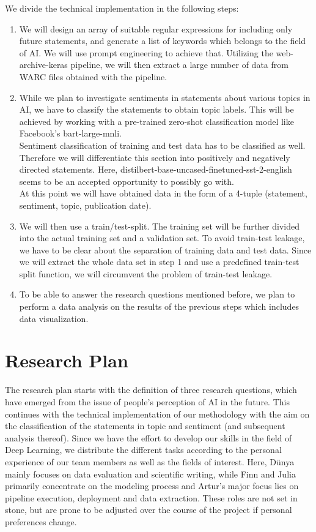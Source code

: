 \documentclass[11pt]{article}
\begin{document}
We divide the technical implementation in the following steps:

\begin{enumerate}
\item We will design an array of suitable regular expressions for including only future statements, and generate a list of keywords which belongs to the field of AI. We will use prompt engineering to achieve that. Utilizing the web-archive-keras pipeline, we will then extract a large number of data from WARC files obtained with the pipeline.

\item While we plan to investigate sentiments in statements about various topics in AI, we have to classify the statements to obtain topic labels. This will be achieved by working with a pre-trained zero-shot classification model like Facebook’s bart-large-mnli.
\\ Sentiment classification of training and test data has to be classified as well. Therefore we will differentiate this section into positively and negatively directed statements. Here, distilbert-base-uncased-finetuned-sst-2-english seems to be an accepted opportunity to possibly go with.
\\ At this point we will have obtained data in the form of a 4-tuple (statement, sentiment, topic, publication date).
    
\item We will then use a train/test-split. The training set will be further divided into the actual training set and a validation set. To avoid train-test leakage, we have to be clear about the separation of training data and test data. Since we will extract the whole data set in step 1 and use a predefined train-test split function, we will circumvent the problem of train-test leakage.
\item To be able to answer the research questions mentioned before, we plan to perform a data analysis on the results of the previous steps which includes data visualization.
\end{enumerate}

\section{Research Plan}

The research plan starts with the definition of three research questions, which have emerged from the issue of people’s perception of AI in the future. This continues with the technical implementation of our methodology with the aim on the classification of the statements in topic and sentiment (and subsequent analysis thereof). Since we have the effort to develop our skills in the field of Deep Learning, we distribute the different tasks according to the personal experience of our team members as well as the fields of interest. Here, Dünya mainly focuses on data evaluation and scientific writing, while Finn and Julia primarily concentrate on the modeling process and Artur's major focus lies on pipeline execution, deployment and data extraction. These roles are not set in stone, but are prone to be adjusted over the course of the project if personal preferences change.
\end{document}
